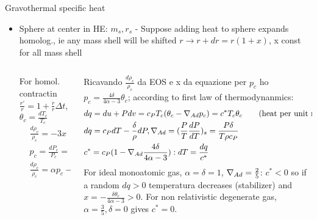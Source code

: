 \begin{frame}{Gravothermal specific heat}
    \begin{itemize}
        \item Sphere at center in HE: $m_s, r_s$ - Suppose adding heat to sphere expands homolog., ie any mass shell will be shifted $r\to r+dr=r(1+x)$, x const for all mass shell 
            \begin{columns}[T]
                \begin{column}{0.3\textwidth}
                    For homol. contractin $\frac{r'}{r}=1+\frac{\dot{r}}{r}\Delta t$, $\theta_c=\frac{dT_c}{T_c}$
                    \begin{align*}
                        &\frac{d\rho_c}{\rho_c}=-3x\\
                        &p_c=\frac{dP_c}{P_c}=-4x\\
                        &\frac{d\rho_c}{\rho_c}=\alpha p_c-\delta\theta_c\tag{EOS}
                    \end{align*}
                \end{column}
                \begin{column}{0.7\textwidth}
                    Ricavando $\frac{d\rho_c}{\rho_c}$ da EOS e x da equazione per $p_c$ ho $p_c=\frac{4\delta}{4\alpha-3}\theta_c$; according to first law of thermodynanmics:
                    \begin{align*}
                        &dq=du+Pdv=c_PT_c(\theta_c-\nad{}p_c)=c^*T_c\theta_c\tag{heat per unit mass added to sphere}\\
                        &dq=c_PdT-\frac{\delta}{\rho}dP, \nad{}=(\frac{P}{T}\TDy{T}{P})_s=\frac{P\delta}{T\rho c_P}\\
                        &c^*=c_P(1-\nad{}\frac{4\delta}{4\alpha-3}): dT=\frac{dq}{c^*}
                    \end{align*}
                    For ideal monoatomic gas, $\alpha=\delta=1$, $\nad{}=\frac{2}{5}$: $c^*<0$ so if a random $dq>0$ temperatura decreases (stabilizer) and $x=-\frac{\delta\theta_c}{4\alpha-3}>0$. For non relativistic degenerate gas, $\alpha=\frac{3}{5},\delta=0$ gives $c^*=0$.
                \end{column}
            \end{columns}
            
        \end{itemize}
\end{frame}


